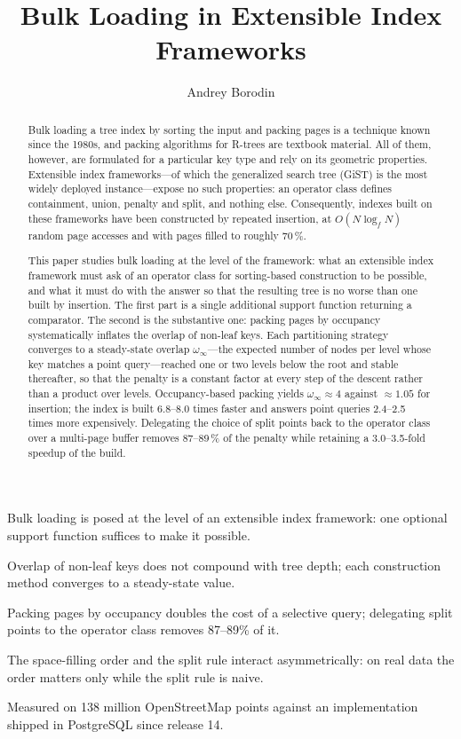 \documentclass[preprint, 11pt]{elsarticle}
\begin{document}
\begin{frontmatter}

\title{Bulk Loading in Extensible Index Frameworks}

\author[yc]{Andrey Borodin}
\address[yc]{Yandex Cloud, Yekaterinburg, Russia}

\begin{highlights}
\item Bulk loading is posed at the level of an extensible index framework:
      one optional support function suffices to make it possible.
\item Overlap of non-leaf keys does not compound with tree depth; each
      construction method converges to a steady-state value.
\item Packing pages by occupancy doubles the cost of a selective query;
      delegating split points to the operator class removes 87--89\% of it.
\item The space-filling order and the split rule interact asymmetrically: on
      real data the order matters only while the split rule is naive.
\item Measured on 138 million OpenStreetMap points against an implementation
      shipped in PostgreSQL since release 14.
\end{highlights}

\begin{abstract}
Bulk loading a tree index by sorting the input and packing pages is a technique
known since the 1980s, and packing algorithms for R-trees are textbook
material. All of them, however, are formulated for a particular key type and
rely on its geometric properties. Extensible index frameworks---of which the
generalized search tree (GiST) is the most widely deployed instance---expose no
such properties: an operator class defines containment, union, penalty and
split, and nothing else. Consequently, indexes built on these frameworks have
been constructed by repeated insertion, at $O(N \log_f N)$ random page accesses
and with pages filled to roughly 70\,\%.

This paper studies bulk loading at the level of the framework: what an
extensible index framework must ask of an operator class for sorting-based
construction to be possible, and what it must do with the answer so that the
resulting tree is no worse than one built by insertion. The first part is a
single additional support function returning a comparator. The second is the
substantive one: packing pages by occupancy systematically inflates the overlap
of non-leaf keys. Each partitioning strategy converges to a steady-state
overlap $\omega_\infty$---the expected number of nodes per level whose key
matches a point query---reached one or two levels below the root and stable
thereafter, so that the penalty is a constant factor at every step of the
descent rather than a product over levels. Occupancy-based packing yields
$\omega_\infty \approx 4$ against $\approx 1.05$ for insertion; the index is
built 6.8--8.0 times faster and answers point queries 2.4--2.5 times more
expensively. Delegating the choice of split points back to the operator class
over a multi-page buffer removes 87--89\,\% of the penalty while retaining a
3.0--3.5-fold speedup of the build.


\end{abstract}
\end{frontmatter}
\end{document}
